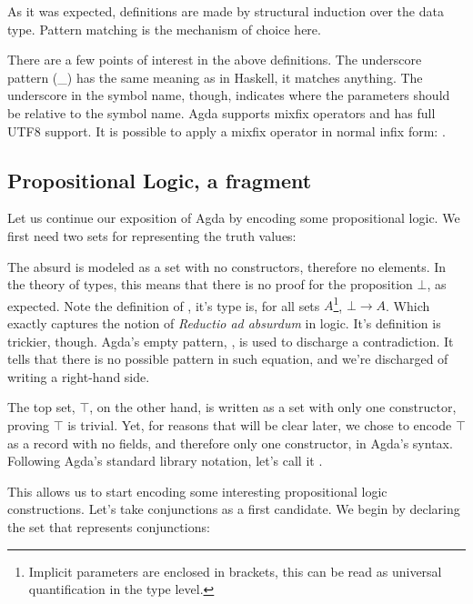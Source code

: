 As it was expected, definitions are made by structural induction over the
data type. Pattern matching is the mechanism of choice here.


There are a few points of interest in the above definitions. The underscore pattern
(\_) has the same meaning as in Haskell, it matches anything. The underscore in
the symbol name, though, indicates where the parameters should be relative to the symbol name. 
Agda supports mixfix operators and has full UTF8 support. It is possible to
apply a mixfix operator in normal infix form: .

\subsection{Propositional Logic, a fragment}

Let us continue our exposition of Agda by encoding some propositional logic. 
We first need two sets for representing the truth values:


The absurd is modeled as a set with no constructors, therefore no elements. In the theory of types,
this means that there is no proof for the proposition $\bot$, as expected. Note the definition
of , it's type is, for all sets $A$\footnote{
Implicit parameters are enclosed in brackets, this can be read as universal quantification in
the type level.
}, $\bot \rightarrow A$. Which exactly captures
the notion of \emph{Reductio ad absurdum} in logic. It's definition is trickier, though.
Agda's empty pattern, \inlagda{()}, is used to discharge a contradiction. It tells
that there is no possible pattern in such equation, and we're discharged of writing
a right-hand side.

The top set, $\top$, on the other
hand, is written as a set with only one constructor, proving $\top$ is trivial. Yet, for reasons that will be clear 
later, we chose to encode $\top$ as a record with no fields, and therefore only one constructor,  in Agda's syntax.
Following Agda's standard library notation, let's call it .


This allows us to start encoding some interesting propositional logic constructions. Let's take
conjunctions as a first candidate. We begin by declaring the set that represents conjunctions:

